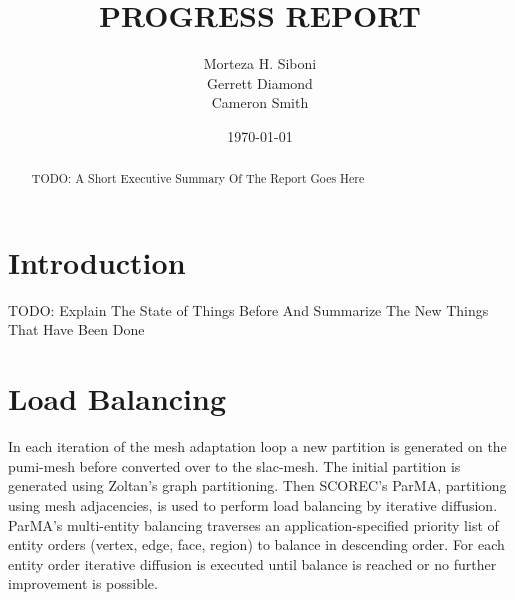 \documentclass[review,authoryear,12pt]{elsarticle_summary_report}
\begin{document}
\title{PROGRESS REPORT}%

\author[]{Morteza H. Siboni \\
Gerrett Diamond \\
Cameron Smith}



\date{\today}



\begin{abstract}
  TODO: A Short Executive Summary Of The Report Goes Here
\end{abstract}


\maketitle




\section{Introduction}
TODO: Explain The State of Things Before And Summarize The New Things That Have Been Done

\section{Load Balancing}
In each iteration of the mesh adaptation loop a new partition is generated on the
pumi-mesh before converted over to the slac-mesh. The initial partition is generated
using Zoltan's graph partitioning. Then SCOREC's ParMA, partitiong using mesh adjacencies,
is used to perform load balancing by iterative diffusion. ParMA's multi-entity balancing
traverses an application-specified priority list of entity orders (vertex, edge, face,
region) to balance in descending order.
For each entity order iterative diffusion is executed until balance is reached
or no further improvement is possible.
\end{document}
